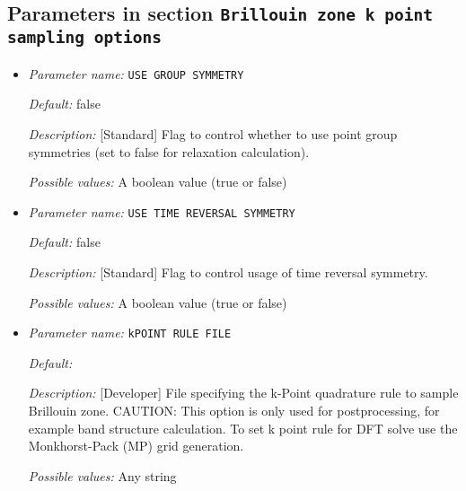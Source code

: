 \subsection{Parameters in section \tt Brillouin zone k point sampling options}
\label{parameters:Brillouin_20zone_20k_20point_20sampling_20options}

\begin{itemize}
\item {\it Parameter name:} {\tt USE GROUP SYMMETRY}
\label{parameters:Brillouin zone k point sampling options/USE GROUP SYMMETRY}
\label{parameters:Brillouin_20zone_20k_20point_20sampling_20options/USE_20GROUP_20SYMMETRY}




{\it Default:} false


{\it Description:} [Standard] Flag to control whether to use point group symmetries (set to false for relaxation calculation).


{\it Possible values:} A boolean value (true or false)
\item {\it Parameter name:} {\tt USE TIME REVERSAL SYMMETRY}
\label{parameters:Brillouin zone k point sampling options/USE TIME REVERSAL SYMMETRY}
\label{parameters:Brillouin_20zone_20k_20point_20sampling_20options/USE_20TIME_20REVERSAL_20SYMMETRY}




{\it Default:} false


{\it Description:} [Standard] Flag to control usage of time reversal symmetry.


{\it Possible values:} A boolean value (true or false)
\item {\it Parameter name:} {\tt kPOINT RULE FILE}
\label{parameters:Brillouin zone k point sampling options/kPOINT RULE FILE}
\label{parameters:Brillouin_20zone_20k_20point_20sampling_20options/kPOINT_20RULE_20FILE}




{\it Default:} 


{\it Description:} [Developer] File specifying the k-Point quadrature rule to sample Brillouin zone. CAUTION: This option is only used for postprocessing, for example band structure calculation. To set k point rule for DFT solve use the Monkhorst-Pack (MP) grid generation.


{\it Possible values:} Any string
\end{itemize}



